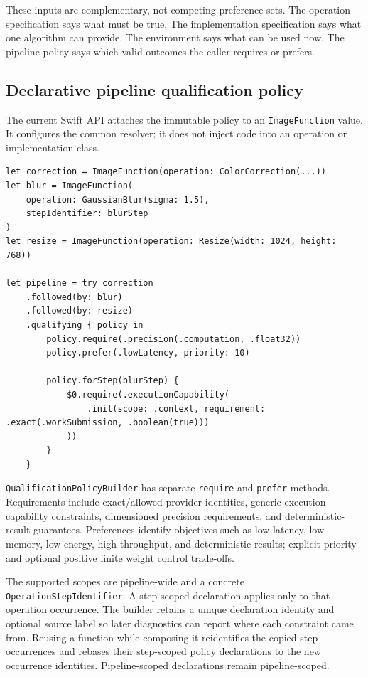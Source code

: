 \documentclass[11pt,a4paper,oneside]{article}
\begin{document}
These inputs are complementary, not competing preference sets. The operation specification says what must be true. The implementation specification says what one algorithm can provide. The environment says what can be used now. The pipeline policy says which valid outcomes the caller requires or prefers.

\subsection{Declarative pipeline qualification policy}

The current Swift API attaches the immutable policy to an \texttt{ImageFunction} value. It configures the common resolver; it does not inject code into an operation or implementation class.

\begin{lstlisting}
let correction = ImageFunction(operation: ColorCorrection(...))
let blur = ImageFunction(
    operation: GaussianBlur(sigma: 1.5),
    stepIdentifier: blurStep
)
let resize = ImageFunction(operation: Resize(width: 1024, height: 768))

let pipeline = try correction
    .followed(by: blur)
    .followed(by: resize)
    .qualifying { policy in
        policy.require(.precision(.computation, .float32))
        policy.prefer(.lowLatency, priority: 10)

        policy.forStep(blurStep) {
            $0.require(.executionCapability(
                .init(scope: .context, requirement: .exact(.workSubmission, .boolean(true)))
            ))
        }
    }
\end{lstlisting}

\texttt{QualificationPolicyBuilder} has separate \texttt{require} and \texttt{prefer} methods. Requirements include exact/allowed provider identities, generic execution-capability constraints, dimensioned precision requirements, and deterministic-result guarantees. Preferences identify objectives such as low latency, low memory, low energy, high throughput, and deterministic results; explicit priority and optional positive finite weight control trade-offs.

The supported scopes are pipeline-wide and a concrete \texttt{OperationStepIdentifier}. A step-scoped declaration applies only to that operation occurrence. The builder retains a unique declaration identity and optional source label so later diagnostics can report where each constraint came from. Reusing a function while composing it reidentifies the copied step occurrences and rebases their step-scoped policy declarations to the new occurrence identities. Pipeline-scoped declarations remain pipeline-scoped.
\end{document}
